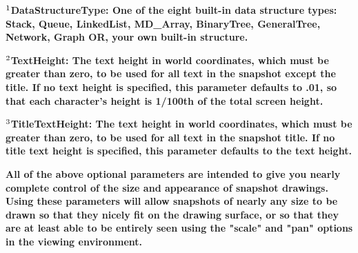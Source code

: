 \documentclass[12pt]{article}
\begin{document}
\begin{flushleft}

\end{flushleft}

\begin{flushleft}
\textbf{$^{\mathrm{{\footnotesize{}1}}}$}\textbf{{\footnotesize{}DataStructureType:  One of the eight built-in data structure types: Stack, Queue, LinkedList, MD\_Array, BinaryTree, GeneralTree, Network, Graph OR, your own built-in structure.  }}
\end{flushleft}

\begin{flushleft}

\end{flushleft}

\begin{flushleft}
\textbf{$^{\mathrm{{\footnotesize{}2}}}$}\textbf{{\footnotesize{}TextHeight:  The text height in world coordinates, which must be greater than zero, to be used for all text in the snapshot except the title.  If no text height is specified, this parameter defaults to .01, so that each character's height is 1/100th of the total screen height.}}
\end{flushleft}

\begin{flushleft}

\end{flushleft}

\begin{flushleft}
\textbf{$^{\mathrm{{\footnotesize{}3}}}$}\textbf{{\footnotesize{}TitleTextHeight:  The text height in world coordinates, which must be greater than zero, to be used for all text in the snapshot title.  If no title text height is specified, this parameter defaults to the text height.}}
\end{flushleft}

\begin{flushleft}

\end{flushleft}

\begin{flushleft}
\textbf{{\footnotesize{}All of the above optional parameters are intended to give you nearly complete control of the size and appearance of snapshot drawings.  Using these parameters will allow snapshots of nearly any size to be drawn so that they nicely fit on the drawing surface, or  so that they  are at least able to be entirely seen using the "scale" and "pan" options in the viewing environment.}}
\end{flushleft}
\end{document}
